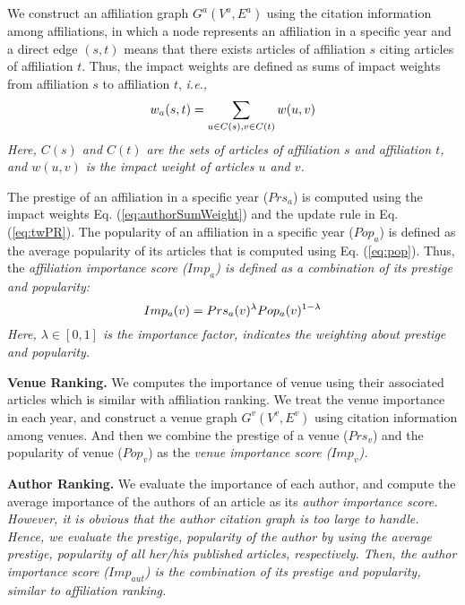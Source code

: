 \par
We construct an affiliation graph $G^a(V^a, E^a)$ using the citation information among affiliations, in which a node represents an affiliation in a specific year and a direct edge $(s, t)$  means that there exists articles of affiliation $s$ citing articles of affiliation $t$. Thus, the impact weights are defined as sums of impact weights from affiliation $s$ to affiliation $t$, \itshape i.e., \upshape
\begin{equation}
\centering
\label{eq:authorSumWeight}
w_a(s,t) = \sum_{u \in C(s), v \in C(t)} w(u,v)
\end{equation}
Here, $C(s)$ and $C(t)$ are the sets of articles of affiliation $s$ and affiliation $t$, and $w(u,v)$ is the impact weight of articles $u$ and $v$.

\par
The prestige of an affiliation in a specific year ($Prs_a$) is computed using the impact weights Eq. (\ref{eq:authorSumWeight}) and the update rule in Eq. (\ref{eq:twPR}). The popularity of an affiliation in a specific year ($Pop_a$) is defined as the average popularity of its articles that is computed using Eq. (\ref{eq:pop}). Thus, the \itshape affiliation importance score \upshape ($Imp_a$) is defined as a combination of its prestige and popularity:
\begin{equation}
\centering
\label{eq:imp}
Imp_a(v) = Prs_a(v)^{\lambda} Pop_a(v)^{1-\lambda}
\end{equation}
Here, $\lambda \in [0, 1]$ is the importance factor, indicates the weighting about prestige and popularity.

\textbf{Venue Ranking.}
We computes the importance of venue using their associated articles which is similar with affiliation ranking. We treat the venue importance in each year, and construct a venue graph $G^v(V^v, E^v)$ using citation information among venues. And then we combine the prestige of a venue ($Prs_v$) and the popularity of venue ($Pop_v$) as the \itshape venue importance score \upshape ($Imp_v$).


\textbf{Author Ranking.}
We evaluate the importance of each author, and compute the average importance of the authors of an article as its \itshape author importance score. \upshape However, it is obvious that the author citation graph is too large to handle. Hence, we evaluate the prestige, popularity of the author by using the average prestige, popularity of all her/his published articles, respectively. Then, the author importance score ($Imp_{aut}$) is the combination of its prestige and popularity, similar to affiliation ranking.


